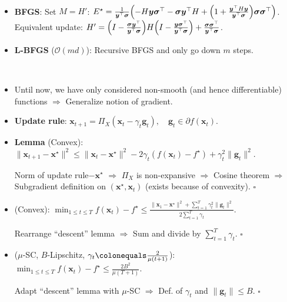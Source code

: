 \documentclass[8pt,a4paper]{extarticle}
\renewcommand{\proof}[1]{\begin{tcolorbox}#1 \hfill $\square$\end{tcolorbox}}
\newcommand{\lft}{\mathopen{}\mathclose\bgroup\left}
\newcommand{\rgt}{\aftergroup\egroup\right}
\renewcommand{\vec}[1]{\bm{#1}}
\newcommand{\mat}[1]{#1}
\newenvironment{topic}[1]
{\textbf{\sffamily \colorbox{black}{\rlap{\textbf{\textcolor{white}{#1}}}\hspace{\linewidth}\hspace{-2\fboxsep}}} \\ \vspace{0.2cm}}
{}
\begin{document}
\begin{multicols*}{2}
\begin{topic}{Quasi-Newton methods}
\begin{itemize}
            \item \textbf{BFGS}: Set $\mat{M} = \mat{H}'$: $\mat{E}^\star = \frac{1}{\vec{y}^\top \vec{\sigma}} \lft( - \mat{H} \vec{y} \vec{\sigma}^\top - \vec{\sigma} \vec{y}^\top \mat{H} + \lft( 1 + \frac{\vec{y}^\top \mat{H} \vec{y}}{\vec{y}^\top \vec{\sigma}} \rgt) \vec{\sigma} \vec{\sigma}^\top \rgt)$.
                  Equivalent update: $\mat{H}' = \lft( \mat{I} - \frac{\vec{\sigma} \vec{y}^\top}{\vec{y}^\top \vec{\sigma}} \rgt) \mat{H} \lft( \mat{I} - \frac{\vec{y} \vec{\sigma}^\top}{\vec{y}^\top \vec{\sigma}} \rgt) + \frac{\vec{\sigma} \vec{\sigma}^\top}{\vec{y}^\top \vec{\sigma}}$.
            \item \textbf{L-BFGS} ($\mathcal{O}(md)$): Recursive BFGS and only go down $m$ steps.
        \end{itemize}
    \end{topic}

    \begin{topic}{Subgradient method}
        \begin{itemize}
            \item Until now, we have only considered non-smooth (and hence differentiable) functions $\Rightarrow$
                  Generalize notion of gradient.
            \item \textbf{Update rule}: $\vec{x}_{t+1} = \Pi_X(\vec{x}_t - \gamma_t \vec{g}_t), \quad \vec{g}_t \in \partial f(\vec{x}_t)$.
            \item \textbf{Lemma} (Convex): $\| \vec{x}_{t+1} - \vec{x}^\star \|^2 \leq \| \vec{x}_t - \vec{x}^\star \|^2 - 2 \gamma_t (f(\vec{x}_t) - f^\star) + \gamma_t^2 \| \vec{g}_t \|^2$.
                  \proof{Norm of update rule$-\vec{x}^\star$ $\Rightarrow$ $\Pi_X$ is non-expansive $\Rightarrow$ Cosine theorem $\Rightarrow$ Subgradient definition on $(\vec{x}^\star, \vec{x}_t)$ (exists because of convexity).}
            \item (Convex): $\min_{1 \leq t \leq T} f(\vec{x}_t) - f^\star \leq \frac{\| \vec{x}_1 - \vec{x}^\star \|^2 + \sum_{t=1}^{T} \gamma_t^2 \| \vec{g}_t \|^2}{2 \sum_{t=1}^{T} \gamma_t}$.
                  \proof{Rearrange ``descent'' lemma $\Rightarrow$ Sum and divide by $\sum_{t=1}^T \gamma_t$.}
            \item ($\mu$-SC, $B$-Lipschitz, $\gamma_t \colonequals \frac{2}{\mu(t+1)}$): $\min_{1 \leq t \leq T} f(\vec{x}_t) - f^\star \leq \frac{2B^2}{\mu(T+1)}$.
                  \proof{Adapt ``descent'' lemma with $\mu$-SC $\Rightarrow$ Def. of $\gamma_t$ and $\| \vec{g}_t \| \leq B$.}
        \end{itemize}
    \end{topic}


\end{multicols*}
\end{document}
